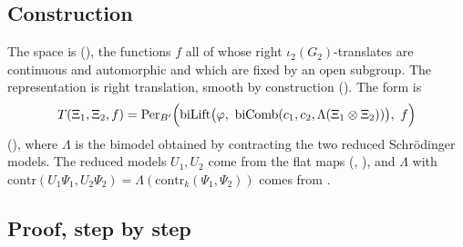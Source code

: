 \documentclass[11pt]{article}
\begin{document}
\subsection{Construction}

The space is  (), the functions $f$ all of whose right $\iota_2(G_2)$-translates are continuous and automorphic and which are fixed by an open subgroup. The representation is right translation, smooth by construction (). The form is
\[
T(\Xi_1,\Xi_2,f)=\mathrm{Per}_{B'}\Bigl(\mathrm{biLift}\bigl(\varphi,\ \mathrm{biComb}(c_1,c_2,\Lambda(\Xi_1\otimes\Xi_2))\bigr),\ f\Bigr)
\]
(), where $\Lambda$ is the bimodel obtained by contracting the two reduced Schr\"odinger models. The reduced models $U_1,U_2$ come from the flat maps (, ), and $\Lambda$ with $\mathrm{contr}(U_1\Psi_1,U_2\Psi_2)=\Lambda(\mathrm{contr}_k(\Psi_1,\Psi_2))$ comes from .

\subsection{Proof, step by step}
\end{document}
